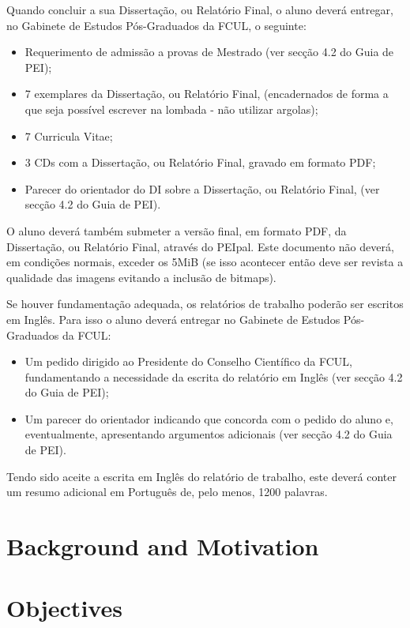 Quando concluir a sua Dissertação, ou Relatório Final, o aluno deverá entregar, no Gabinete de Estudos Pós-Graduados da FCUL, o seguinte:

\begin{itemize}
\item Requerimento de admissão a provas de Mestrado (ver secção 4.2 do Guia de PEI);
\item 7 exemplares da Dissertação, ou Relatório Final, (encadernados de forma a que seja possível escrever na lombada - não utilizar argolas);
\item 7 Curricula Vitae;
\item 3 CDs com a Dissertação, ou Relatório Final, gravado em formato PDF;
\item Parecer do orientador do DI sobre a Dissertação, ou Relatório Final, (ver secção 4.2 do Guia de PEI).
\end{itemize}

O aluno deverá também submeter a versão final, em formato PDF, da Dissertação, ou Relatório Final, através do PEIpal. Este documento não deverá, em condições normais, exceder os 5MiB (se isso acontecer então deve ser revista a qualidade das imagens evitando a inclusão de bitmaps).

Se houver fundamentação adequada, os relatórios de trabalho poderão ser escritos em Inglês. Para isso o aluno deverá entregar no Gabinete de Estudos Pós-Graduados da FCUL:

\begin{itemize}
\item Um pedido dirigido ao Presidente do Conselho Científico da FCUL, fundamentando a necessidade da escrita do relatório em Inglês (ver secção 4.2 do Guia de PEI);
\item Um parecer do orientador indicando que concorda com o pedido do aluno e, eventualmente, apresentando argumentos adicionais (ver secção 4.2 do Guia de PEI).
\end{itemize}

Tendo sido aceite a escrita em Inglês do relatório de trabalho, este deverá conter um resumo adicional em Português de, pelo menos, 1200 palavras.

\section{Background and Motivation}

\section{Objectives}


